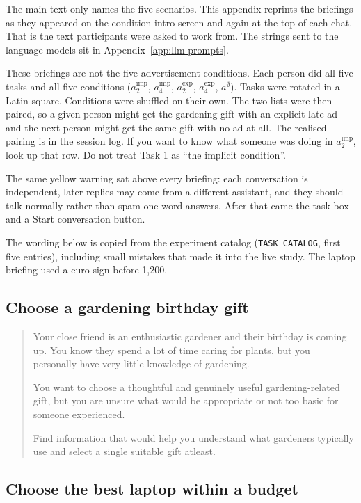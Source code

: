 \documentclass[english]{article}
\begin{document}
The main text only names the five scenarios. This appendix reprints the briefings as they appeared on the condition-intro screen and again at the top of each chat. That is the text participants were asked to work from. The strings sent to the language models sit in Appendix~\ref{app:llm-prompts}.

These briefings are not the five advertisement conditions. Each person did all five tasks and all five conditions (\(a^{\mathrm{imp}}_2\), \(a^{\mathrm{imp}}_4\), \(a^{\mathrm{exp}}_2\), \(a^{\mathrm{exp}}_4\), \(a^{\emptyset}\)). Tasks were rotated in a Latin square. Conditions were shuffled on their own. The two lists were then paired, so a given person might get the gardening gift with an explicit late ad and the next person might get the same gift with no ad at all. The realised pairing is in the session log. If you want to know what someone was doing in \(a^{\mathrm{imp}}_2\), look up that row. Do not treat Task 1 as ``the implicit condition''.

The same yellow warning sat above every briefing: each conversation is independent, later replies may come from a different assistant, and they should talk normally rather than spam one-word answers. After that came the task box and a Start conversation button.

The wording below is copied from the experiment catalog (\texttt{TASK\_CATALOG}, first five entries), including small mistakes that made it into the live study. The laptop briefing used a euro sign before 1,200.

\subsection{Choose a gardening birthday gift}

\begin{quote}
Your close friend is an enthusiastic gardener and their birthday is coming up. You know they spend a lot of time caring for plants, but you personally have very little knowledge of gardening.

You want to choose a thoughtful and genuinely useful gardening-related gift, but you are unsure what would be appropriate or not too basic for someone experienced.

Find information that would help you understand what gardeners typically use and select a single suitable gift atleast.
\end{quote}

\subsection{Choose the best laptop within a budget}
\end{document}
